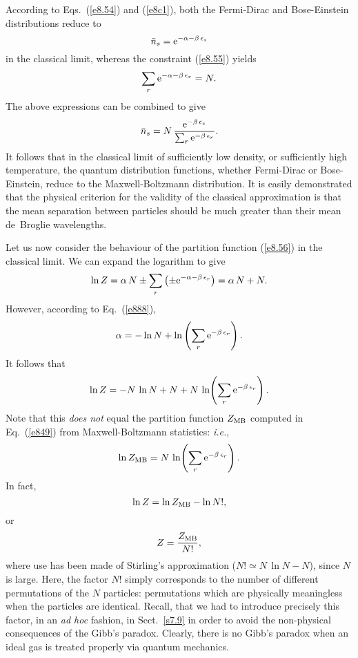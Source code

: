 According to Eqs.~(\ref{e8.54}) and (\ref{e8c1}), both
the  Fermi-Dirac and Bose-Einstein
distributions reduce to
\begin{equation}
\bar{n}_s = {\rm e}^{-\alpha-\beta\,\epsilon_s}
\end{equation}
in the classical limit, whereas the constraint (\ref{e8.55}) yields
\begin{equation}\label{e888}
\sum_r {\rm e}^{-\alpha-\beta\,\epsilon_r} = N.
\end{equation}
The above expressions can be combined to give
\begin{equation}
\bar{n}_s = N\,
 \frac{{\rm e}^{-\beta\,\epsilon_s}}{\sum_r {\rm e}^{-\beta\,\epsilon_r}}.
\end{equation}
It follows that in the classical limit of sufficiently low density,
or sufficiently high temperature, the quantum distribution functions,
whether Fermi-Dirac or Bose-Einstein, reduce to the Maxwell-Boltzmann
distribution. It is easily demonstrated that the physical criterion for the
validity of the classical approximation is that the mean separation between
particles should be much greater than their mean de~Broglie wavelengths.

Let us now consider the behaviour of the partition function (\ref{e8.56})
in the classical limit. We can expand the logarithm to
give
\begin{equation}
\ln Z = \alpha\,N \pm \sum_r\left(\pm {\rm e}^{-\alpha-\beta\,\epsilon_r}\right)
=\alpha\,N +N.
\end{equation}
However, according to Eq.~(\ref{e888}),
\begin{equation}
\alpha =-\ln N + \ln \left({\sum_r {\rm e}^{-\beta\,\epsilon_r}}\right).
\end{equation}
It follows that
\begin{equation}
\ln Z = -N\,\ln N + N +N\,\ln\! \left({\sum_r {\rm e}^{-\beta\,\epsilon_r}}\right).
\end{equation}
Note that this {\em does not}\/ equal the partition function $Z_{\rm MB}$
computed in Eq.~(\ref{e849}) from Maxwell-Boltzmann statistics: {\em i.e.}, 
\begin{equation}
\ln Z_{\rm MB} = N\,\ln\!\left(\sum_r {\rm e}^{-\beta\,\epsilon_r}\right).
\end{equation}
In fact,
\begin{equation}
\ln Z = \ln Z_{\rm MB} - \ln N!,
\end{equation}
or
\begin{equation}
Z = \frac{Z_{\rm MB}}{N!},
\end{equation}
where use has been made of Stirling's approximation ($N!\simeq N\,\ln N - N$),
since $N$ is large. Here, the factor $N!$ simply corresponds to the number
of different permutations of the $N$ particles: permutations which are
physically meaningless when the particles are identical. Recall, that
we had to introduce precisely this factor, in an {\em ad hoc}\/ fashion,
in Sect.~\ref{s7.9} in order to avoid the non-physical consequences of
the Gibb's paradox. Clearly, there is no Gibb's paradox when an ideal
gas is treated properly via quantum mechanics. 

